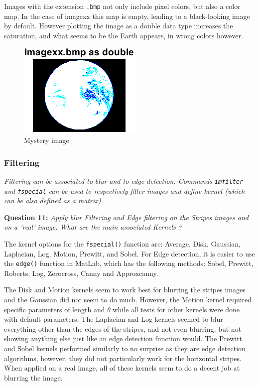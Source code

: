 Images with the extension \texttt{.bmp} not only include pixel colors, but also a color map. In the case of imagexx this map is empty, leading to a black-looking image by default. However plotting the image as a double data type increases the saturation, and what seems to be the Earth appears, in wrong colors however.
\begin{figure}[!ht]
    \centering
        \includegraphics[width=0.5\linewidth]{Doc/Graphics/Part1/Q10_Mystery.png}
    \caption{Mystery image}
    \label{fig:enter-label}
\end{figure}
\FloatBarrier




\subsubsection{Filtering}
\textit{Filtering can be associated to blur and to edge detection. Commands \texttt{imfilter} and \texttt{fspecial} can be used to respectively ﬁlter images and deﬁne kernel (which can be also deﬁned as a matrix).}


\textbf{Question 11:}
\textit{Apply blur Filtering and Edge ﬁltering on the Stripes images and on a ’real’ image. What are the main associated Kernels ?}

The kernel options for the \texttt{fspecial()} function are:
Average, Disk, Gaussian, Laplacian, Log, Motion, Prewitt, and Sobel. For Edge detection, it is easier to use the \texttt{edge()} function in MatLab, which has the following methods: Sobel, Prewitt, Roberts, Log, Zerocross, Canny and Approxcanny.

The Disk and Motion kernels seem to work best for blurring the stripes images and the Gaussian did not seem to do much. However, the Motion kernel required specific parameters of length and $\theta$ while all tests for other kernels were done with default parameters. The Laplacian and Log kernels seemed to blur everything other than the edges of the stripes, and not even blurring, but not showing anything else just like an edge detection function would. 
The Prewitt and Sobel kernels performed similarly to no surprise as they are edge detection algorithms, however, they did not particularly work for the horizontal stripes.
When applied on a real image, all of these kernels seem to do a decent job at blurring the image. 

